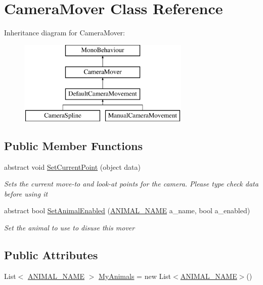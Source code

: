 \hypertarget{class_camera_mover}{}\section{Camera\+Mover Class Reference}
\label{class_camera_mover}
Inheritance diagram for Camera\+Mover\+:\begin{figure}[H]
\begin{center}
\leavevmode
\includegraphics[height=4.000000cm]{class_camera_mover}
\end{center}
\end{figure}
\subsection*{Public Member Functions}
\begin{DoxyCompactItemize}
\item 
abstract void \mbox{\hyperlink{class_camera_mover_ab2f77d1df91324b508a7a45f1f22a04a}{Set\+Current\+Point}} (object data)
\begin{DoxyCompactList}\small\item\em Sets the current move-\/to and look-\/at points for the camera. Please type check {\itshape data}  before using it \end{DoxyCompactList}\item 
abstract bool \mbox{\hyperlink{class_camera_mover_ae64e8ff4b4850290695f1cf1f7d866ba}{Set\+Animal\+Enabled}} (\mbox{\hyperlink{_animal_8cs_a2fa5713399b84d1b88dae9196837af50}{A\+N\+I\+M\+A\+L\+\_\+\+N\+A\+ME}} a\+\_\+name, bool a\+\_\+enabled)
\begin{DoxyCompactList}\small\item\em Set the animal to use to disuse this mover \end{DoxyCompactList}\end{DoxyCompactItemize}
\subsection*{Public Attributes}
\begin{DoxyCompactItemize}
\item 
List$<$ \mbox{\hyperlink{_animal_8cs_a2fa5713399b84d1b88dae9196837af50}{A\+N\+I\+M\+A\+L\+\_\+\+N\+A\+ME}} $>$ \mbox{\hyperlink{class_camera_mover_a5c2dba444b1de7c8354809cf0650fabf}{My\+Animals}} = new List$<$\mbox{\hyperlink{_animal_8cs_a2fa5713399b84d1b88dae9196837af50}{A\+N\+I\+M\+A\+L\+\_\+\+N\+A\+ME}}$>$()
\end{DoxyCompactItemize}
